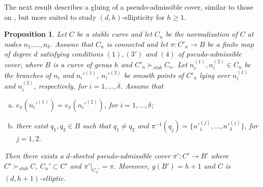 \documentclass{article}
\newtheorem{proposition}[theorem]{Proposition}
\newcommand{\steq}{\succ_{stab}}
\renewcommand{\:}{\colon }
\begin{document}
The next result describes a gluing of a pseudo-admissible cover, similar to those on \cite{paper1}, but more suited to study $(d,h)$-ellipticity for $h\geq 1$.

\begin{proposition}\label{prop:construction}%
Let $C$ be a stable curve and 
let $C_n$ be  the normalization of $C$ at nodes 
$n_1,\ldots,n_{\delta}$. 
Assume that $C_n$ is connected and let $\pi: {C}'_n\rightarrow B$ be a finite map of degree $d$ satisfying  conditions $(1), ({3}')$ and $(4)$ of pseudo-admissible cover, where $B$ is a curve 
 of genus $h$ and ${C}'_n\steq C_n$. %
 Let $n_i^{(1)}, n_i^{(2)} \in C_n$ be the branches of $n_i$ and  ${n}_i'^{(1)}$, ${n}_i'^{(2)}$ be smooth points of ${C}'_n$ lying over $n_i^{(1)}$ and $ n_i^{(2)}$, respectively, for $i=1,\ldots, \delta$.
Assume that 
\begin{enumerate}[(a)]
\item $e_\pi({n}_i'^{(1)})=e_\pi({n}_i'^{(2)})$, for $i=1,\ldots, \delta$; 
\item there exist $q_1,q_2\in B$ such that $q_1\neq q_2$ and
$\pi^{-1}(q_j)=\{n'^{(j)}_1, \ldots,n'^{(j)}_{\delta} \}$, for $j=1,2$. 
\end{enumerate} 
Then there exists a $d$-sheeted pseudo-admissible cover ${\pi}':{C}' \rightarrow {B}'$ 
where 
 $C'\steq C$, $C_n'\subset C'$ and $\pi'|_{C_n'}=\pi$.
Moreover, $g({B}')=h+1$
and $C$ is $(d,h+1)$-elliptic. %
\end{proposition}
\end{document}
